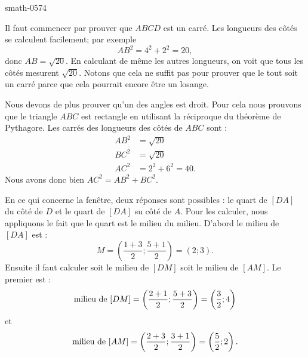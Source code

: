 
\begin{corrige}{smath-0574}

    Il faut commencer par prouver que \( ABCD\) est un carré. Les longueurs des côtés se calculent facilement; par exemple
    \begin{equation}
        AB^2=4^2+2^2=20,
    \end{equation}
    donc \( AB=\sqrt{20}\). En calculant de même les autres longueurs, on voit que tous les côtés mesurent \( \sqrt{20}\). Notons que cela ne suffit pas pour prouver que le tout soit un carré parce que cela pourrait encore être un losange. 
    
    Nous devons de plus prouver qu'un des angles est droit. Pour cela nous prouvons que le triangle \( ABC\) est rectangle en utilisant la réciproque du théorème de Pythagore. Les carrés des longueurs des côtés de \( ABC\) sont :
    \begin{subequations}
        \begin{align}
            AB^2&=\sqrt{20}\\
            BC^2&=\sqrt{20}\\
            AC^2&=2^2+6^2=40.
        \end{align}
    \end{subequations}
    Nous avons donc bien \( AC^2=AB^2+BC^2\).


    En ce qui concerne la fenêtre, deux réponses sont possibles : le quart de \( [DA]\) du côté de \( D\) et le quart de \( [DA]\) su côté de \( A\). Pour les calculer, nous appliquons le fait que le quart est le milieu du milieu. D'abord le milieu de \( [DA]\) est :
    \begin{equation}
        M=\left( \frac{ 1+3 }{2};\frac{ 5+1 }{2} \right)=(2;3).
    \end{equation}
    Ensuite il faut calculer soit le milieu de \( [DM]\) soit le milieu de \( [AM]\). Le premier est :
    \begin{equation}
        \text{milieu de \( [DM]\)}=\left( \frac{ 2+1 }{2};\frac{ 5+3 }{2} \right)=\left( \frac{ 3 }{2};4 \right)
    \end{equation}
    et
    \begin{equation}
        \text{milieu de \( [AM]\)}=\left( \frac{ 2+3 }{2};\frac{ 3+1 }{2} \right)=\left( \frac{ 5 }{2};2 \right).
    \end{equation}

\end{corrige}
